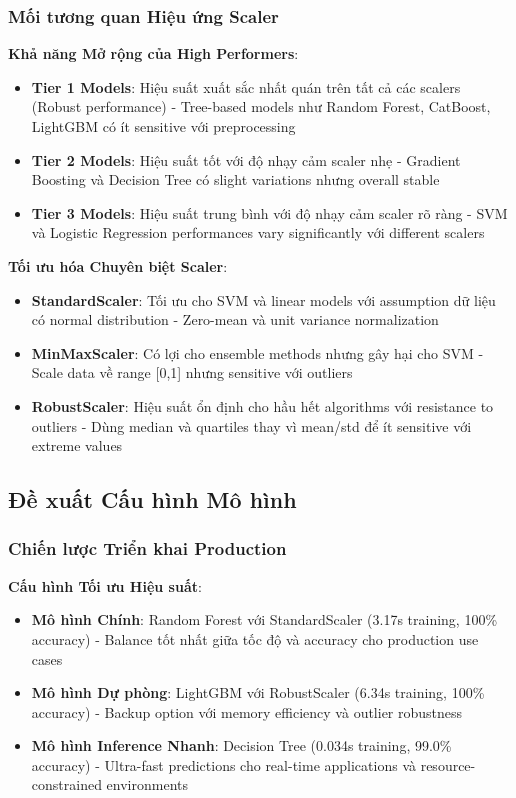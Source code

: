 \subsubsection{Mối tương quan Hiệu ứng Scaler}

\textbf{Khả năng Mở rộng của High Performers}:
\begin{itemize}
    \item \textbf{Tier 1 Models}: Hiệu suất xuất sắc nhất quán trên tất cả các scalers (Robust performance) - Tree-based models như Random Forest, CatBoost, LightGBM có ít sensitive với preprocessing
    \item \textbf{Tier 2 Models}: Hiệu suất tốt với độ nhạy cảm scaler nhẹ - Gradient Boosting và Decision Tree có slight variations nhưng overall stable  
    \item \textbf{Tier 3 Models}: Hiệu suất trung bình với độ nhạy cảm scaler rõ ràng - SVM và Logistic Regression performances vary significantly với different scalers
\end{itemize}

\textbf{Tối ưu hóa Chuyên biệt Scaler}:
\begin{itemize}
    \item \textbf{StandardScaler}: Tối ưu cho SVM và linear models với assumption dữ liệu có normal distribution - Zero-mean và unit variance normalization
    \item \textbf{MinMaxScaler}: Có lợi cho ensemble methods nhưng gây hại cho SVM - Scale data về range [0,1] nhưng sensitive với outliers
    \item \textbf{RobustScaler}: Hiệu suất ổn định cho hầu hết algorithms với resistance to outliers - Dùng median và quartiles thay vì mean/std để ít sensitive với extreme values
\end{itemize}

\subsection{Đề xuất Cấu hình Mô hình}\label{subsec:device-recommendations}

\subsubsection{Chiến lược Triển khai Production}

\textbf{Cấu hình Tối ưu Hiệu suất}:
\begin{itemize}
    \item \textbf{Mô hình Chính}: Random Forest với StandardScaler (3.17s training, 100\% accuracy) - Balance tốt nhất giữa tốc độ và accuracy cho production use cases
    \item \textbf{Mô hình Dự phòng}: LightGBM với RobustScaler (6.34s training, 100\% accuracy) - Backup option với memory efficiency và outlier robustness  
    \item \textbf{Mô hình Inference Nhanh}: Decision Tree (0.034s training, 99.0\% accuracy) - Ultra-fast predictions cho real-time applications và resource-constrained environments
\end{itemize}

